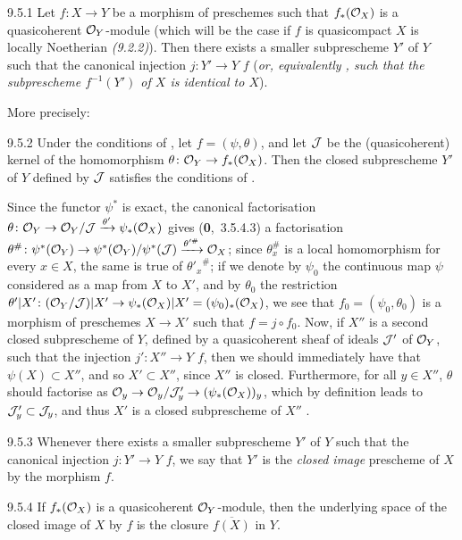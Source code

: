 
\begin{env}[Proposition]{9.5.1}
\label{prop-1.9.5.1}
Let $f\colon X\to Y$ be a morphism of preschemes
such that $f_\ast(\mathcal{O}_X)$ is a quasicoherent $\mathcal{O}_Y$-module (which will be the
case if $f$ is quasicompact  $X$ is locally Noetherian
\emph{(9.2.2)}). Then there exists a smaller subprescheme $Y'$ of $Y$ such that
the canonical injection $j\colon Y'\to Y$  $f$ (\emph{or, equivalently
, such that the subprescheme $f^{-1}(Y')$ of $X$ is \emph{identical}
to $X$}).
\end{env}

More precisely:

\begin{env}[Corollary]{9.5.2}
\label{cor-1.9.5.2}
Under the conditions of , let
$f=(\psi,\theta)$, and let $\mathcal{J}$ be the (quasicoherent) kernel of the
homomorphism $\theta\colon\mathcal{O}_Y\to f_\ast(\mathcal{O}_X)$. Then the closed subprescheme
$Y'$ of $Y$ defined by $\mathcal{J}$ satisfies the conditions of .
\end{env}

Since the functor $\psi^\ast$ is exact, the canonical factorisation
$\theta\colon\mathcal{O}_Y\to\mathcal{O}_Y/\mathcal{J}\xrightarrow{\theta'}\psi_\ast(\mathcal{O}_X)$ gives
(\textbf{0},~3.5.4.3) a factorisation
$\theta^\#\colon\psi^\ast(\mathcal{O}_Y)\to\psi^\ast(\mathcal{O}_Y)/\psi^\ast(\mathcal{J})
\xrightarrow{\theta'^\#}\mathcal{O}_X$;
since $\theta_x^\#$ is a local homomorphism for every $x\in X$, the same is true
of ${\theta'_x}^\#$; if we denote by $\psi_0$ the continuous map $\psi$
considered as a map from $X$ to $X'$, and by $\theta_0$ the restriction
$\theta'|X'\colon(\mathcal{O}_Y/\mathcal{J})|X'\to\psi_\ast(\mathcal{O}_X)|X'=(\psi_0)_\ast(\mathcal{O}_X)$,
we see that $f_0=(\psi_0,\theta_0)$ is a morphism of preschemes $X\to X'$
 such that $f=j\circ f_0$. Now, if $X''$ is a second
closed subprescheme of $Y$, defined by a quasicoherent sheaf of ideals
$\mathcal{J}'$ of $\mathcal{O}_Y$, such that the injection $j'\colon X''\to Y$ 
$f$, then we should immediately have that $\psi(X)\subset X''$, and so
$X'\subset X''$, since $X''$ is closed. Furthermore, for all $y\in X''$,
$\theta$ should factorise as $\mathcal{O}_y\to\mathcal{O}_y/\mathcal{J}'_y\to(\psi_\ast(\mathcal{O}_X))_y$,
which by definition leads to $\mathcal{J}'_y\subset\mathcal{J}_y$, and thus $X'$ is
a closed subprescheme of $X''$ .

\begin{envr}[Definition]{9.5.3}
\label{defn-1.9.5.3}
Whenever there exists a smaller subprescheme $Y'$
of $Y$ such that the canonical injection $j\colon Y'\to Y$  $f$, we
say that $Y'$ is the \emph{closed image} prescheme of $X$ by the morphism $f$.
\end{envr}

\begin{env}[Proposition]{9.5.4}
\label{prop-1.9.5.4}
If $f_\ast(\mathcal{O}_X)$ is a quasicoherent $\mathcal{O}_Y$-module, then the underlying space of
the closed image of $X$ by $f$ is the closure $\overline{f(X)}$ in $Y$.
\end{env}

